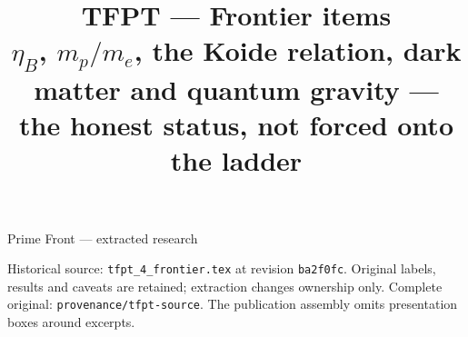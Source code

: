 \documentclass[11pt,a4paper]{article}
\title{\vspace{-1.2cm}\textbf{TFPT --- Frontier items}\\[2mm]
\large $\eta_B$, $m_p/m_e$, the Koide relation, dark matter and quantum gravity ---\\
the honest status, not forced onto the ladder}
\author{\TFPTauthors}\date{\TFPTdatestamp}
\begin{document}
\begin{center}\Large Prime Front --- extracted research\end{center}
\noindent Historical source: \texttt{tfpt\_4\_frontier.tex} at revision \texttt{ba2f0fc}. Original labels, results and caveats are retained; extraction changes ownership only. Complete original: \texttt{provenance/tfpt-source}. The publication assembly omits presentation boxes around excerpts.
\tableofcontents
\clearpage

\end{document}
